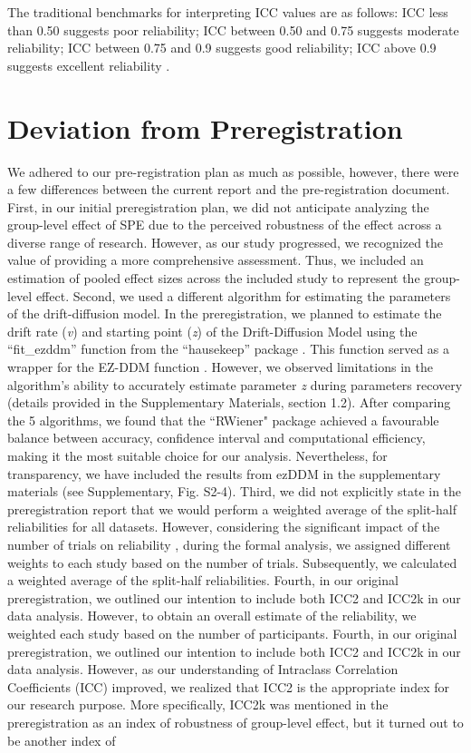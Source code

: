 \documentclass[sn-apa]{sn-jnl}%
\theoremstyle{thmstyleone}%
\theoremstyle{thmstyletwo}%
\theoremstyle{thmstylethree}%
\begin{document}
The traditional benchmarks for interpreting ICC values are as follows: ICC less than 0.50 suggests poor reliability; ICC between 0.50 and 0.75 suggests moderate reliability; ICC between 0.75 and 0.9 suggests good reliability; ICC above 0.9 suggests excellent reliability \parencite{cicchetti1981developing,kupper2020on}.
\newline
\section{Deviation from Preregistration}\label{sec:deviation}

We adhered to our pre-registration plan as much as possible, however, there were a few differences between the current report and the pre-registration document. First, in our initial preregistration plan, we did not anticipate analyzing the group-level effect of SPE due to the perceived robustness of the effect across a diverse range of research. However, as our study progressed, we recognized the value of providing a more comprehensive assessment. Thus, we included an estimation of pooled effect sizes across the included study to represent the group-level effect. Second, we used a different algorithm for estimating the parameters of the drift-diffusion model. In the preregistration, we planned to estimate the drift rate (\textit{v}) and starting point (\textit{z}) of the Drift-Diffusion Model using the ``fit\_ezddm” function from the ``hausekeep” package \parencite{lin2020strong}. This function served as a wrapper for the EZ-DDM function \parencite{wagenmakers2007an}. However, we observed limitations in the algorithm's ability to accurately estimate parameter \textit{z} during parameters recovery (details provided in the Supplementary Materials, section 1.2). After comparing the 5 algorithms, we found that the ``RWiener" package \parencite{wabersich2014rwiener} achieved a favourable balance between accuracy, confidence interval and computational efficiency, making it the most suitable choice for our analysis. Nevertheless, for transparency, we have included the results from ezDDM in the supplementary materials (see Supplementary, Fig. S2-4). Third, we did not explicitly state in the preregistration report that we would perform a weighted average of the split-half reliabilities for all datasets. However, considering the significant impact of the number of trials on reliability \parencite{kucina2023calibration}, during the formal analysis, we assigned different weights to each study based on the number of trials. Subsequently, we calculated a weighted average of the split-half reliabilities. Fourth, in our original preregistration, we outlined our intention to include both ICC2 and ICC2k in our data analysis. However, to obtain an overall estimate of the reliability, we weighted each study based on the number of participants. Fourth, in our original preregistration, we outlined our intention to include both ICC2 and ICC2k in our data analysis. However, as our understanding of Intraclass Correlation Coefficients (ICC) improved, we realized that ICC2 is the appropriate index for our research purpose. More specifically, ICC2k was mentioned in the preregistration as an index of robustness of group-level effect, but it turned out to be another index of 
\end{document}
